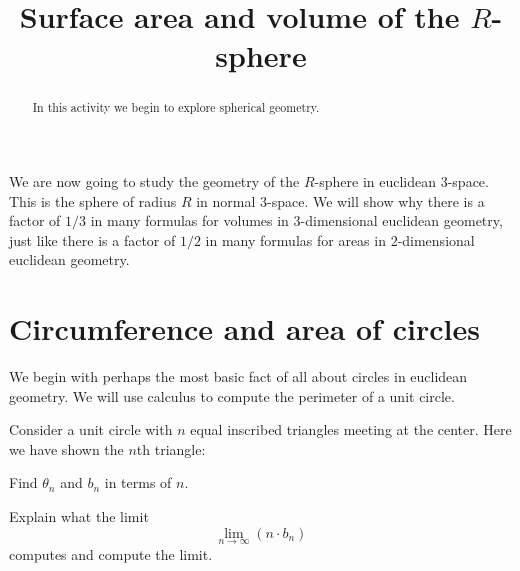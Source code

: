 \documentclass[newpage,hints,handout]{ximera}
\title{Surface area and volume of the $R$-sphere}
\begin{document}
\begin{abstract}
In this activity we begin to explore spherical geometry.
\end{abstract}
\maketitle


We are now going to study the geometry of the $R$-sphere in euclidean
$3$-space. This is the sphere of radius $R$ in normal $3$-space.  We
will show why there is a factor of $1/3$ in many formulas for volumes
in $3$-dimensional euclidean geometry, just like there is a factor of
$1/2$ in many formulas for areas in $2$-dimensional euclidean
geometry.



\section{Circumference and area of circles}

We begin with perhaps the most basic fact of all about circles in
euclidean geometry. We will use calculus to compute the perimeter of a unit
circle.


\begin{problem}
Consider a unit circle with $n$ equal inscribed triangles meeting at the center.
Here we have shown the $n$th triangle:
\begin{image}
\end{image}
Find $\theta_n$ and $b_n$ in terms of $n$.
\end{problem}


\begin{problem}
Explain what the limit
\[
\lim_{n\to\infty} \left(n\cdot b_n\right)
\]
computes and compute the limit.
\end{problem}
\end{document}
